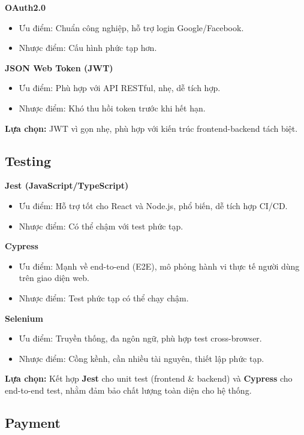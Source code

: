 \documentclass{article}
\begin{document}
\textbf{OAuth2.0}
\begin{itemize}
    \item Ưu điểm: Chuẩn công nghiệp, hỗ trợ login Google/Facebook.
    \item Nhược điểm: Cấu hình phức tạp hơn.
\end{itemize}

\textbf{JSON Web Token (JWT)}
\begin{itemize}
    \item Ưu điểm: Phù hợp với API RESTful, nhẹ, dễ tích hợp.
    \item Nhược điểm: Khó thu hồi token trước khi hết hạn.
\end{itemize}

\textbf{Lựa chọn:} JWT vì gọn nhẹ, phù hợp với kiến trúc frontend-backend tách biệt.


\subsection{Testing}

\textbf{Jest (JavaScript/TypeScript)}
\begin{itemize}
    \item Ưu điểm: Hỗ trợ tốt cho React và Node.js, phổ biến, dễ tích hợp CI/CD.
    \item Nhược điểm: Có thể chậm với test phức tạp.
\end{itemize}

\textbf{Cypress}
\begin{itemize}
    \item Ưu điểm: Mạnh về end-to-end (E2E), mô phỏng hành vi thực tế người dùng trên giao diện web.
    \item Nhược điểm: Test phức tạp có thể chạy chậm.
\end{itemize}

\textbf{Selenium}
\begin{itemize}
    \item Ưu điểm: Truyền thống, đa ngôn ngữ, phù hợp test cross-browser.
    \item Nhược điểm: Cồng kềnh, cần nhiều tài nguyên, thiết lập phức tạp.
\end{itemize}

\textbf{Lựa chọn:} Kết hợp \textbf{Jest} cho unit test (frontend \& backend) và \textbf{Cypress} cho end-to-end test, nhằm đảm bảo chất lượng toàn diện cho hệ thống.


\subsection{Payment}
\end{document}
